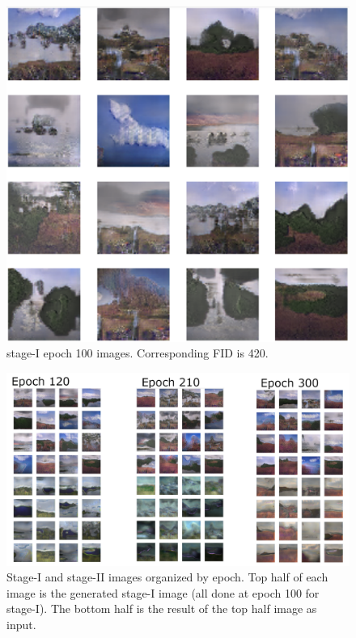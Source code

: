 \documentclass{article}
\begin{document}
	\begin{figure}[h]
	\centering
	\includegraphics[scale=0.4]{images/StageI_epoch100_FID420.png}
	\caption{stage-I epoch 100 images. Corresponding FID is 420.}
	\label{fig:stage1Images}
	\end{figure}


	\begin{figure}[h]
	\centering
	\includegraphics[scale=1]{images/StageIandII.png}
	\caption{Stage-I and stage-II images organized by epoch. Top half of each image is the generated stage-I image (all done at epoch 100 for stage-I). The bottom half is the result of the top half image as input.}
	\label{fig:stage2Images}
	\end{figure}
\end{document}
